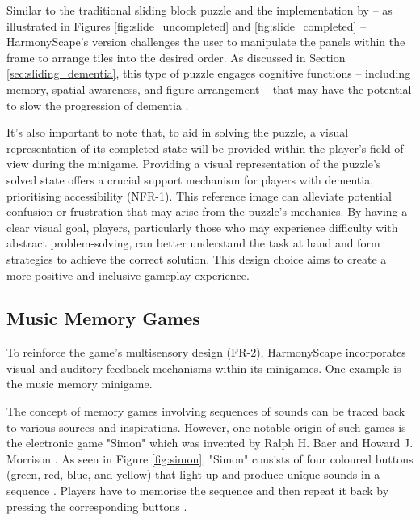 \documentclass{l4proj}
\begin{document}
Similar to the traditional sliding block puzzle and the implementation by \cite{sasaki_proposal_2020} – as illustrated in Figures \ref{fig:slide_uncompleted} and \ref{fig:slide_completed} – HarmonyScape's version challenges the user to manipulate the panels within the frame to arrange tiles into the desired order. As discussed in Section \ref{sec:sliding_dementia}, this type of puzzle engages cognitive functions – including memory, spatial awareness, and figure arrangement – that may have the potential to slow the progression of dementia \citep{sasaki_proposal_2020}.

It's also important to note that, to aid in solving the puzzle, a visual representation of its completed state will be provided within the player's field of view during the minigame. Providing a visual representation of the puzzle's solved state offers a crucial support mechanism for players with dementia, prioritising accessibility (NFR-1). This reference image can alleviate potential confusion or frustration that may arise from the puzzle's mechanics. By having a clear visual goal, players, particularly those who may experience difficulty with abstract problem-solving, can better understand the task at hand and form strategies to achieve the correct solution.  This design choice aims to create a more positive and inclusive gameplay experience.

\subsection{Music Memory Games}
To reinforce the game's multisensory design (FR-2), HarmonyScape incorporates visual and auditory feedback mechanisms within its minigames. One example is the music memory minigame. 

The concept of memory games involving sequences of sounds can be traced back to various sources and inspirations. However, one notable origin of such games is the electronic game "Simon" which was invented by Ralph H. Baer and Howard J. Morrison \citep{morrison_microcomputer_1980}. As seen in Figure \ref{fig:simon}, "Simon" consists of four coloured buttons (green, red, blue, and yellow) that light up and produce unique sounds in a sequence \citep{morrison_microcomputer_1980}. Players have to memorise the sequence and then repeat it back by pressing the corresponding buttons \citep{morrison_microcomputer_1980}.

\end{document}
